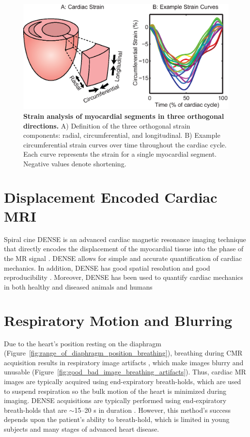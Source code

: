  	\begin{figure}
 		\centering
 		\includegraphics{figures/intro/3D_strain_explanation}
 		\caption[Strain analysis of myocardial segments in three orthogonal directions]{\textbf{Strain analysis of myocardial segments in three orthogonal directions.} A) Definition of the three orthogonal strain components: radial, circumferential, and longitudinal. B) Example circumferential strain curves over time throughout the cardiac cycle. Each curve represents the strain for a single myocardial segment. Negative values denote shortening.}
 		\label{fig:3D_strain_explanation}
 	\end{figure}

\section{Displacement Encoded Cardiac MRI}
	Spiral cine DENSE is an advanced cardiac magnetic resonance imaging technique that directly encodes the displacement of the myocardial tissue into the phase of the MR signal \cite{Aletras1999b}. DENSE allows for simple and accurate quantification of cardiac mechanics. In addition, DENSE has good spatial resolution and good reproducibility \cite{Haggerty2013,Wehner2015a}. Moreover, DENSE has been used to quantify cardiac mechanics in both healthy and diseased animals and humans \cite{Aletras1999b,Aletras1999c,Kim2004,Ernande2012,Haggerty2013}

\section{Respiratory Motion and Blurring}
	Due to the heart's position resting on the diaphragm (Figure~\ref{fig:range_of_diaphragm_position_breathing}), breathing during CMR acquisition results in respiratory image artifacts \cite{Axel1986}, which make images blurry and unusable (Figure~\ref{fig:good_bad_image_breathing_artifacts}). Thus, cardiac MR images are typically acquired using end-expiratory breath-holds, which are used to suspend respiration so the bulk motion of the heart is minimized during imaging. DENSE acquisitions are typically performed using end-expiratory breath-holds that are $\sim$15--20 s in duration \cite{Kim2004,Zhong2006a,Ernande2012,Zhong2010a,Aletras2005,Spottiswoode2007,Young2012c}. However, this method's success depends upon the patient's ability to breath-hold, which is limited in young subjects and many stages of advanced heart disease.
	

